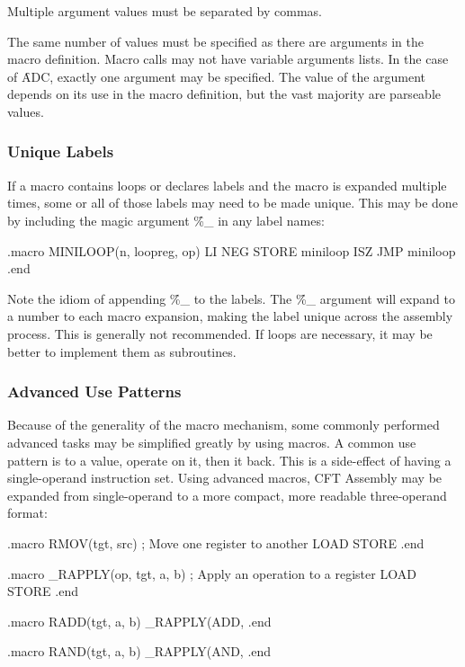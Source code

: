 Multiple argument values must be separated by commas.

The same number of values must be specified as there are arguments in the macro
definition. Macro calls may not have variable arguments lists. In the case of
\f{ADC}, exactly one argument may be specified. The value of the argument
depends on its use in the macro definition, but the vast majority are parseable
values.

\subsubsection{Unique Labels}

If a macro contains loops or declares labels and the macro is expanded multiple
times, some or all of those labels may need to be made unique. This may be done
by including the magic argument \f{\%\_} in any label names:

\begin{cftasmcode}
.macro MINILOOP(n, loopreg, op)
    LI %
    NEG
    STORE %
miniloop%
    ISZ %
    JMP miniloop%
.end
\end{cftasmcode}

Note the idiom of appending \f{\%\_} to the labels. The \f{\%\_} argument will
expand to a number to each macro expansion, making the label unique across the
assembly process. This is generally not recommended. If loops are necessary, it
may be better to implement them as subroutines.


\subsubsection{Advanced Use Patterns}

Because of the generality of the macro mechanism, some commonly performed
advanced tasks may be simplified greatly by using macros. A common use pattern
is to  a value, operate on it, then  it back. This is a
side-effect of having a single-operand instruction set. Using advanced macros,
CFT Assembly may be expanded from single-operand to a more compact, more
readable three-operand format:

\begin{cftasmcode}
.macro RMOV(tgt, src) ; Move one register to another
	LOAD %
	STORE %
.end

.macro _RAPPLY(op, tgt, a, b) ; Apply an operation to a register
	LOAD %
	STORE %
.end

.macro RADD(tgt, a, b)
	_RAPPLY(ADD, %
.end

.macro RAND(tgt, a, b)
	_RAPPLY(AND, %
.end
\end{cftasmcode}

